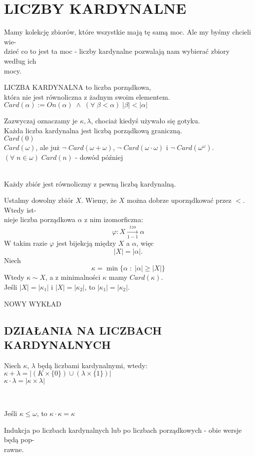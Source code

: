 \section{LICZBY KARDYNALNE}
Mamy kolekcję zbiorów, które wszystkie mają tę samą moc. Ale my byśmy chcieli wie-\\dzieć co to jest ta moc - liczby kardynalne pozwalają nam wybierać zbiory według ich \\mocy.\bigskip
\begin{center}\large
    {\color{def}LICZBA KARDYNALNA} to liczba porządkowa, \\która nie jest równoliczna z żadnym swoim elementem.\smallskip\\
    $Card(\alpha):=On(\alpha)\;\land\;(\forall\;\beta<\alpha)\;|\beta|<|\alpha|$
\end{center}\medskip
Zazwyczaj oznaczamy je $\kappa, \lambda$, chociaż kiedyś używało się gotyku.\bigskip\\
{\large\color{acc}Każda liczba kardynalna jest liczbą porządkową graniczną.}\medskip\\
$Card(0)$\smallskip\\
$Card(\omega)$, ale już $\neg\;Card(\omega+\omega)$, $\neg\;Card(\omega\cdot\omega)$ i $\neg\;Card(\omega^\omega)$.\smallskip\\
$(\forall\;n\in\omega)\;Card(n)$ - dowód później\bigskip\\
\bigskip\\
\begin{center}\large
    Każdy zbiór jest równoliczny z pewną liczbą kardynalną.
\end{center}
\dowod
Ustalmy dowolny zbiór $X$. Wiemy, że $X$ można dobrze uporządkować przez $<$. Wtedy ist-\\nieje liczba porządkowa $\alpha$ z nim izomorficzna:
$$\varphi:X\xrightarrow[1-1]{izo}\alpha$$
W takim razie $\varphi$ jest bijekcją między $X$ a $\alpha$, więc
$$|X|=|\alpha|.$$
Niech
$$\kappa=\min\{\alpha\;:\;|\alpha|\geq|X|\}$$
Wtedy $\kappa\sim X$, a z minimalności $\kappa$ mamy $Card(\kappa)$.\medskip\\
Jeśli $|X|=|\kappa_1|$ i $|X|=|\kappa_2|$, to $|\kappa_1|=|\kappa_2|$.


NOWY WYKŁAD

\subsection{DZIAŁANIA NA LICZBACH KARDYNALNYCH}
\begin{center}\large
    Niech $\kappa$, $\lambda$ będą liczbami kardynalnymi, wtedy:\medskip\\
    $\kappa+\lambda = |(K\times\{0\})\cup(\lambda\times\{1\})|$\medskip\\
    $\kappa\cdot\lambda = |\kappa\times\lambda|$
\end{center}\bigskip
{}\bigskip\\
\begin{center}\large
    Jeśli $\kappa\leq\omega$, to $\kappa\cdot\kappa = \kappa$
\end{center}
\dowod
Indukcja po liczbach kardynalnych lub po liczbach porządkowych - obie wersje będą pop-\\rawne.
